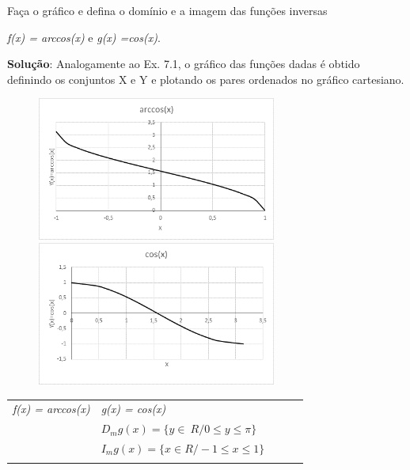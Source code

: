 \begin{texemplo}
Faça o gráfico e defina o domínio e a imagem das funções inversas

\textit{f(x) = arccos(x) }e\textit{  g(x) =cos(x)}.

\textbf{Solução}: Analogamente ao Ex. 7.1, o gráfico das funções dadas é obtido definindo os conjuntos X e Y e plotando os pares ordenados no gráfico cartesiano.

\begin{figure}[H]
\begin{center}
    \includegraphics[width=0.70\textwidth]{capitulos/trigonometria_e_funcoes_trigonometricas/media/image49.png}
\end{center}
\begin{center}
	\includegraphics[width=0.70\textwidth]{capitulos/trigonometria_e_funcoes_trigonometricas/media/image50.png}
\end{center}
\end{figure}

\begin{table}[H]
             \centering
\begin{tabular}{p{0.96in}p{0.41in}p{0.39in}p{0.39in}p{0.39in}}
\hline
\multicolumn{1}{|p{2.10in}}{\centering\textit{f(x) = arccos(x)}} &
\multicolumn{1}{|p{2.10in}|}{\centering\textit{g(x) = cos(x)}} \\
\hhline{-----}
\multicolumn{1}{|p{2.10in}}{\centering\textit{$D_{m}f \left( x \right) = \{ x \in  R /-1  \leq x \leq 1 \}$}} &
\multicolumn{1}{|p{2.10in}|}{\centering\textit{$D_{m}g \left( x \right) = \{ y \in ~R  / 0  \leq  y  \leq   \pi\}$}}   \\
\hhline{-----}
\multicolumn{1}{|p{2.10in}}{\centering\textit{$I_{m}f \left( x \right) = \{ y \in ~R  / 0  \leq  y  \leq   \pi\}$}}  &
\multicolumn{1}{|p{2.10in}|}{\centering\textit{$I_{m}g \left( x \right) = \{ x \in  R /-1  \leq x \leq 1 \}$}} \\
\hhline{-----}
\end{tabular}
 \end{table}


\end{texemplo}
